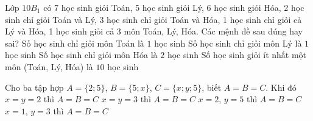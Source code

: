 \begin{ex}%
	Lớp $10 B_1$ có 7 học sinh giỏi Toán, 5 học sinh giỏi Lý, 6 học sinh giỏi Hóa, 2 học sinh chỉ giỏi Toán và Lý, 3 học sinh chỉ giỏi Toán và Hóa, 1 học sinh chỉ giỏi cả Lý và Hóa, 1 học sinh giỏi cả 3 môn Toán, Lý, Hóa. Các mệnh đề sau đúng hay sai?
	\choiceTF
	{ Số học sinh chỉ giỏi môn Toán là $1$ học sinh}
	{Số học sinh chỉ giỏi môn Lý là $1$ học sinh}
	{Số học sinh chỉ giỏi môn Hóa là $2$ học sinh}
	{Số học sinh giỏi ít nhất một môn (Toán, Lý, Hóa) là $10$ học sinh}
\end{ex}

\begin{ex}%
	Cho ba tập hợp $A=\{2; 5\}$, $B=\{5 ; x\}$, $C=\{x ; y ; 5\}$, biết $A=B=C$. Khi đó
	\choiceTF
	{$x=y=2$ thì $A=B=C$}  
	{$x=y=3$ thì $A=B=C$}
	{$x=2$, $y=5$ thì $A=B=C$}
	{$x=1$, $y=3$ thì $A=B=C$}
\end{ex}


